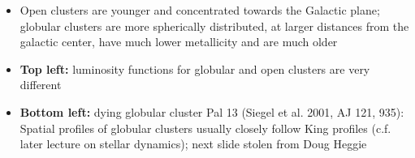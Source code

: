 \documentclass[letterpaper,landscape]{slides}
\begin{document}
\begin{slide}
{\begin{minipage}[t]{13cm}
\begin{itemize}
\item Open clusters are younger and concentrated towards the Galactic plane;
      globular clusters are more spherically distributed, at larger distances
      from the galactic center, have much lower metallicity and are much older
\item {\bf Top left:} luminosity functions for globular and open clusters 
       are very different 
\item {\bf Bottom left:} dying globular cluster Pal 13 (Siegel et al. 2001, 
      AJ 121, 935): Spatial profiles of globular clusters usually closely 
      follow King profiles (c.f. later lecture on stellar dynamics);
      next slide stolen from Doug Heggie
\end{itemize}

\end{minipage}}
\vfill 
\end{slide}

\end{document}

